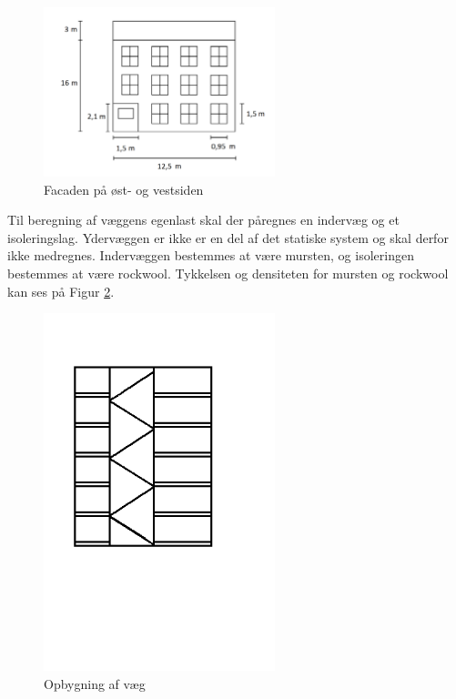 \begin{figure}[H]
	\centering
	\includegraphics[width=0.6\textwidth]{billeder/facadenord.png}
	\caption{Facaden på øst- og vestsiden}
	\label{fig:facade}
\end{figure}

Til beregning af væggens egenlast skal der påregnes en indervæg og et isoleringslag. Ydervæggen er ikke er en del af det statiske system og skal derfor ikke medregnes. Indervæggen bestemmes at være mursten, og isoleringen bestemmes at være rockwool. Tykkelsen og densiteten for mursten og rockwool kan ses på Figur \ref{fig:vaeg}.

\begin{figure}[H]
	\centering
	\includegraphics[width=0.6\textwidth]{billeder/mur.png}
	\caption{Opbygning af væg}
	\label{fig:vaeg}
\end{figure}

